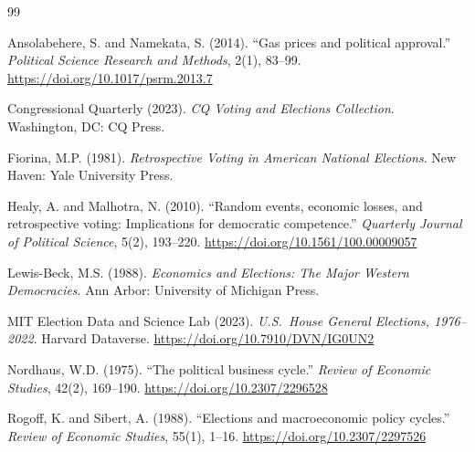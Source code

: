 \documentclass[12pt]{article}
\begin{document}
\clearpage

\begin{thebibliography}{99}
\setlength{\itemsep}{2pt}

Ansolabehere, S. and Namekata, S. (2014).
``Gas prices and political approval.''
\textit{Political Science Research and Methods}, 2(1), 83--99.
\url{https://doi.org/10.1017/psrm.2013.7}

Congressional Quarterly (2023).
\textit{CQ Voting and Elections Collection}.
Washington, DC: CQ Press.

Fiorina, M.P. (1981).
\textit{Retrospective Voting in American National Elections}.
New Haven: Yale University Press.

Healy, A. and Malhotra, N. (2010).
``Random events, economic losses, and retrospective voting:
Implications for democratic competence.''
\textit{Quarterly Journal of Political Science}, 5(2), 193--220.
\url{https://doi.org/10.1561/100.00009057}

Lewis-Beck, M.S. (1988).
\textit{Economics and Elections: The Major Western Democracies}.
Ann Arbor: University of Michigan Press.

MIT Election Data and Science Lab (2023).
\textit{U.S.\ House General Elections, 1976--2022}.
Harvard Dataverse.
\url{https://doi.org/10.7910/DVN/IG0UN2}

Nordhaus, W.D. (1975).
``The political business cycle.''
\textit{Review of Economic Studies}, 42(2), 169--190.
\url{https://doi.org/10.2307/2296528}

Rogoff, K. and Sibert, A. (1988).
``Elections and macroeconomic policy cycles.''
\textit{Review of Economic Studies}, 55(1), 1--16.
\url{https://doi.org/10.2307/2297526}

\end{thebibliography}

\clearpage
\end{document}
